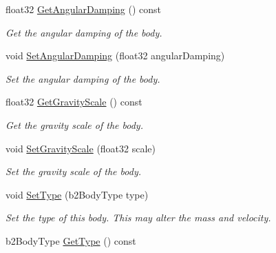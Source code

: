 \begin{DoxyCompactItemize}
\mbox{\label{classb2Body_a151f5e81e44037883f61b67821704999}} 
float32 \hyperlink{classb2Body_a151f5e81e44037883f61b67821704999}{Get\+Angular\+Damping} () const
\begin{DoxyCompactList}\small\item\em Get the angular damping of the body. \end{DoxyCompactList}\item 
\mbox{\label{classb2Body_a73a79541b18394fa224d2eae8ad493e8}} 
void \hyperlink{classb2Body_a73a79541b18394fa224d2eae8ad493e8}{Set\+Angular\+Damping} (float32 angular\+Damping)
\begin{DoxyCompactList}\small\item\em Set the angular damping of the body. \end{DoxyCompactList}\item 
\mbox{\label{classb2Body_aa570b2310248b4b3bd776836e839bc45}} 
float32 \hyperlink{classb2Body_aa570b2310248b4b3bd776836e839bc45}{Get\+Gravity\+Scale} () const
\begin{DoxyCompactList}\small\item\em Get the gravity scale of the body. \end{DoxyCompactList}\item 
\mbox{\label{classb2Body_a8e66a570c2aeee93b29d84cae861a612}} 
void \hyperlink{classb2Body_a8e66a570c2aeee93b29d84cae861a612}{Set\+Gravity\+Scale} (float32 scale)
\begin{DoxyCompactList}\small\item\em Set the gravity scale of the body. \end{DoxyCompactList}\item 
\mbox{\label{classb2Body_a34ff1c84b10b74eb990749a025a1b1ad}} 
void \hyperlink{classb2Body_a34ff1c84b10b74eb990749a025a1b1ad}{Set\+Type} (b2\+Body\+Type type)
\begin{DoxyCompactList}\small\item\em Set the type of this body. This may alter the mass and velocity. \end{DoxyCompactList}\item 
\mbox{\label{classb2Body_a9c2234b5a5fff91305a65ecd0cf0ee59}} 
b2\+Body\+Type \hyperlink{classb2Body_a9c2234b5a5fff91305a65ecd0cf0ee59}{Get\+Type} () const

\end{DoxyCompactItemize}
